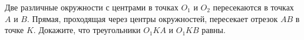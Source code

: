 \begin{ex}
	\begin{condition}
		Две различные окружности с центрами в точках \( O_1\) и \( O_2 \) пересекаются в точках \( A \) и \( B\). Прямая, проходящая через центры окружностей, пересекает отрезок \( AB \) в точке \( K \). Докажите, что треугольники \( O_1KA \) и \( O_1KB \) равны.
	\end{condition}
\end{ex}
